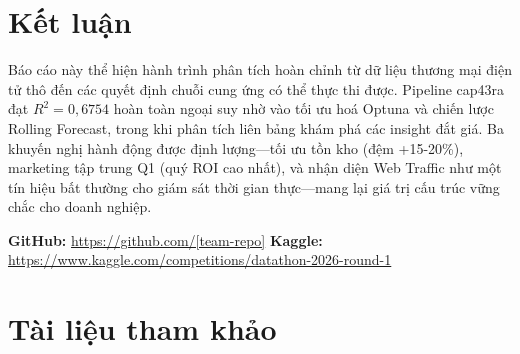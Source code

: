 \documentclass{article}
\begin{document}
\section{Kết luận}

Báo cáo này thể hiện hành trình phân tích hoàn chỉnh từ dữ liệu thương mại điện tử thô đến các quyết định chuỗi cung ứng có thể thực thi được. Pipeline cap43ra đạt $R^2 = 0{,}6754$ hoàn toàn ngoại suy nhờ vào tối ưu hoá Optuna và chiến lược Rolling Forecast, trong khi phân tích liên bảng khám phá các insight đắt giá. Ba khuyến nghị hành động được định lượng---tối ưu tồn kho (đệm +15-20\%), marketing tập trung Q1 (quý ROI cao nhất), và nhận diện Web Traffic như một tín hiệu bất thường cho giám sát thời gian thực---mang lại giá trị cấu trúc vững chắc cho doanh nghiệp.

\textbf{GitHub:} \url{https://github.com/[team-repo]} \quad \textbf{Kaggle:} \url{https://www.kaggle.com/competitions/datathon-2026-round-1}

\section*{Tài liệu tham khảo}
\end{document}
